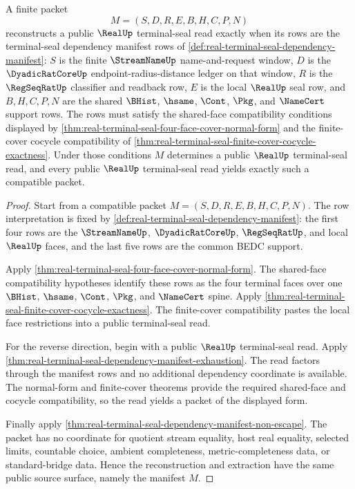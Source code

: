 \begin{theorem}
\label{thm:real-terminal-seal-public-source-completeness}
A finite packet
$$
M=(S,D,R,E,B,H,C,P,N)
$$
reconstructs a public $\RealUp$ terminal-seal read exactly when its rows are the
terminal-seal dependency manifest rows of
\autoref{def:real-terminal-seal-dependency-manifest}: $S$ is the finite
$\StreamNameUp$ name-and-request window, $D$ is the
$\DyadicRatCoreUp$ endpoint-radius-distance ledger on that window, $R$ is the
$\RegSeqRatUp$ classifier and readback row, $E$ is the local $\RealUp$ seal row,
and $B,H,C,P,N$ are the shared $\BHist$, $\hsame$, $\Cont$, $\Pkg$, and
$\NameCert$ support rows. The rows must satisfy the shared-face compatibility
conditions displayed by
\autoref{thm:real-terminal-seal-four-face-cover-normal-form} and the finite-cover
cocycle compatibility of
\autoref{thm:real-terminal-seal-finite-cover-cocycle-exactness}. Under those
conditions $M$ determines a public $\RealUp$ terminal-seal read, and every public
$\RealUp$ terminal-seal read yields exactly such a compatible packet.
\end{theorem}
\begin{proof}
Start from a compatible packet $M=(S,D,R,E,B,H,C,P,N)$. The row interpretation is
fixed by \autoref{def:real-terminal-seal-dependency-manifest}: the first four
rows are the $\StreamNameUp$, $\DyadicRatCoreUp$, $\RegSeqRatUp$, and local
$\RealUp$ faces, and the last five rows are the common BEDC support.

Apply \autoref{thm:real-terminal-seal-four-face-cover-normal-form}. The
shared-face compatibility hypotheses identify these rows as the four terminal
faces over one $\BHist$, $\hsame$, $\Cont$, $\Pkg$, and $\NameCert$ spine. Apply
\autoref{thm:real-terminal-seal-finite-cover-cocycle-exactness}. The finite-cover
compatibility pastes the local face restrictions into a public terminal-seal
read.

For the reverse direction, begin with a public $\RealUp$ terminal-seal read.
Apply \autoref{thm:real-terminal-seal-dependency-manifest-exhaustion}. The read
factors through the manifest rows and no additional dependency coordinate is
available. The normal-form and finite-cover theorems provide the required
shared-face and cocycle compatibility, so the read yields a packet of the
displayed form.

Finally apply
\autoref{thm:real-terminal-seal-dependency-manifest-non-escape}. The packet has
no coordinate for quotient stream equality, host real equality, selected limits,
countable choice, ambient completeness, metric-completeness data, or
standard-bridge data. Hence the reconstruction and extraction have the same
public source surface, namely the manifest $M$.
\end{proof}

